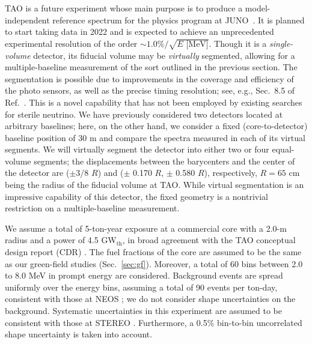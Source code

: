 \documentclass[prd, twocolumn, tightenlines, twoside, secnumarabic, superscriptaddress, preprintnumbers, nofootinbib, notitlepage]{revtex4-1}
\begin{document}
TAO is a future experiment whose main purpose is to produce a model-independent reference spectrum for the physics program at JUNO~\cite{An:2015jdp}. It is planned to start taking data in 2022 and is expected to achieve an unprecedented experimental resolution of the order $\sim1.0\%/\sqrt{E\text{ [MeV]}}$. Though it is a \emph{single-volume} detector, its fiducial volume may be \emph{virtually} segmented, allowing for a multiple-baseline measurement of the sort outlined in the previous section. The segmentation is possible due to improvements in the coverage and efficiency of the photo sensors, as well as the precise timing resolution; see, e.g., Sec.~8.5 of Ref.~\cite{Abusleme:2020bzt}. This is a novel capability that has not been employed by existing searches for sterile neutrino. We have previously considered two detectors located at arbitrary baselines; here, on the other hand, we consider a fixed (core-to-detector) baseline position of 30 m and compare the spectra measured in each of its virtual segments. We will virtually segment the detector into either two or four equal-volume segments; the displacements between the barycenters and the center of the detector are ($\pm 3/8$ $R$) and ($\pm$ 0.170 $R$, $\pm$ 0.580 $R$), respectively, $R = 65$ cm being the radius of the fiducial volume at TAO. While virtual segmentation is an impressive capability of this detector, the fixed geometry is a nontrivial restriction on a multiple-baseline measurement.

We assume a total of 5-ton-year exposure at a commercial core with a 2.0-m radius and a power of 4.5 GW$_{\text{th}}$, in broad agreement with the TAO conceptual design report (CDR) \cite{Abusleme:2020bzt}. The fuel fractions of the core are assumed to be the same as our green-field studies (Sec.~\ref{sec:gf}). Moreover, a total of 60 bins between 2.0 to 8.0 MeV in prompt energy are considered. Background events are spread uniformly over the energy bins, assuming a total of 90 events per ton-day, consistent with those at NEOS \cite{NEOS:2016wee}; we do not consider shape uncertainties on the background. Systematic uncertainties in this experiment are assumed to be consistent with those at STEREO \cite{STEREO:2019ztb}. Furthermore, a 0.5\% bin-to-bin uncorrelated shape uncertainty is taken into account.
\end{document}
